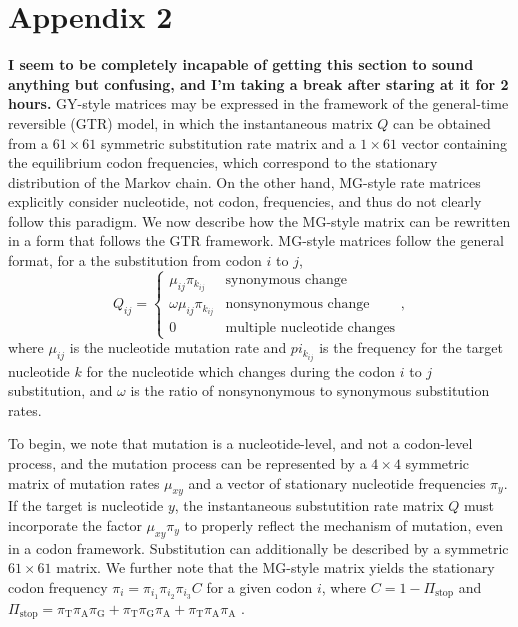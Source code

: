 \documentclass[11pt]{article}
\begin{document}
\bigskip



\section*{Appendix 2}
\textbf{I seem to be completely incapable of getting this section to sound anything but confusing, and I'm taking a break after staring at it for 2 hours.}
GY-style matrices may be expressed in the framework of the general-time reversible (GTR) model, in which the instantaneous matrix $Q$ can be obtained from a $61 \times 61$ symmetric substitution rate matrix and a $1\times61$ vector containing the equilibrium codon frequencies, which correspond to the stationary distribution of the Markov chain. On the other hand, MG-style rate matrices explicitly consider nucleotide, not codon, frequencies, and thus do not clearly follow this paradigm. We now describe how the MG-style matrix can be rewritten in a form that follows the GTR framework. 
MG-style matrices follow the general format, for a the substitution from codon $i$ to $j$, 
\begin{equation}\label{eq:MGstyle}
Q_{ij} = \left\{ 
\begin{array}{rl}
\mu_{ij}\pi_{k_{ij}}        &\mbox{synonymous change} \\
\omega\mu_{ij}\pi_{k_{ij}}  &\mbox{nonsynonymous change} \\
0                           &\mbox{multiple nucleotide changes}       
\end{array} \right. ,
\end{equation} where $\mu_{ij}$ is the nucleotide mutation rate and $pi_{k_{ij}}$ is the frequency for the target nucleotide $k$ for the nucleotide which changes during the codon $i$ to $j$ substitution, and $\omega$ is the ratio of nonsynonymous to synonymous substitution rates.


To begin, we note that mutation is a nucleotide-level, and not a codon-level process, and the mutation process can be represented by a $4 \times 4$ symmetric matrix of mutation rates $\mu_{xy}$ and a vector of stationary nucleotide frequencies $\pi_y$. If the target is nucleotide $y$, the instantaneous substutition rate matrix $Q$ must incorporate the factor $\mu_{xy}\pi_y$ to properly reflect the mechanism of mutation, even in a codon framework. Substitution can additionally be described by a symmetric $61\times61$ matrix. We further note that the MG-style matrix yields the stationary codon frequency $\pi_i = \pi_{i_1}\pi_{i_2}\pi_{i_3}C$ for a given codon $i$, where $C = 1 - \Pi_\text{stop}$ and $\Pi_\text{stop} = \pi_\text{T}\pi_\text{A}\pi_\text{G} + \pi_\text{T}\pi_\text{G}\pi_\text{A} + \pi_\text{T}\pi_\text{A}\pi_\text{A}$ \cite{MuseGaut1994}. 
\end{document}
